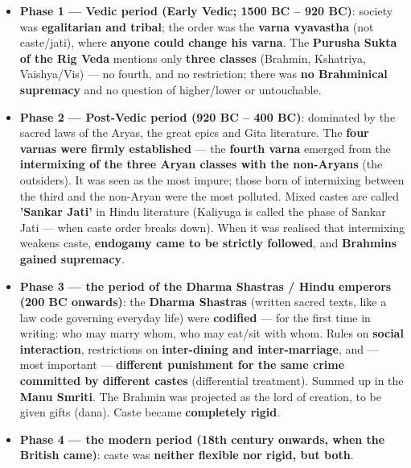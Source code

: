 \begin{KeyConcept}
\begin{itemize}
\item \textbf{Phase 1 --- Vedic period (Early Vedic; 1500 BC -- 920 BC)}: society was \textbf{egalitarian and tribal}; the order was the \textbf{varna vyavastha} (not caste/jati), where \textbf{anyone could change his varna}. The \textbf{Purusha Sukta of the Rig Veda} mentions only \textbf{three classes} (Brahmin, Kshatriya, Vaishya/Vis) --- no fourth, and no restriction; there was \textbf{no Brahminical supremacy} and no question of higher/lower or untouchable.
\item \textbf{Phase 2 --- Post-Vedic period (920 BC -- 400 BC)}: dominated by the sacred laws of the Aryas, the great epics and Gita literature. The \textbf{four varnas were firmly established} --- the \textbf{fourth varna} emerged from the \textbf{intermixing of the three Aryan classes with the non-Aryans} (the outsiders). It was seen as the most impure; those born of intermixing between the third and the non-Aryan were the most polluted. Mixed castes are called \textbf{'Sankar Jati'} in Hindu literature (Kaliyuga is called the phase of Sankar Jati --- when caste order breaks down). When it was realised that intermixing weakens caste, \textbf{endogamy came to be strictly followed}, and \textbf{Brahmins gained supremacy}.
\item \textbf{Phase 3 --- the period of the Dharma Shastras / Hindu emperors (200 BC onwards)}: the \textbf{Dharma Shastras} (written sacred texts, like a law code governing everyday life) were \textbf{codified} --- for the first time in writing: who may marry whom, who may eat/sit with whom. Rules on \textbf{social interaction}, restrictions on \textbf{inter-dining and inter-marriage}, and --- most important --- \textbf{different punishment for the same crime committed by different castes} (differential treatment). Summed up in the \textbf{Manu Smriti}. The Brahmin was projected as the lord of creation, to be given gifts (dana). Caste became \textbf{completely rigid}.
\item \textbf{Phase 4 --- the modern period (18th century onwards, when the British came)}: caste was \textbf{neither flexible nor rigid, but both}.
\end{itemize}
\end{KeyConcept}

